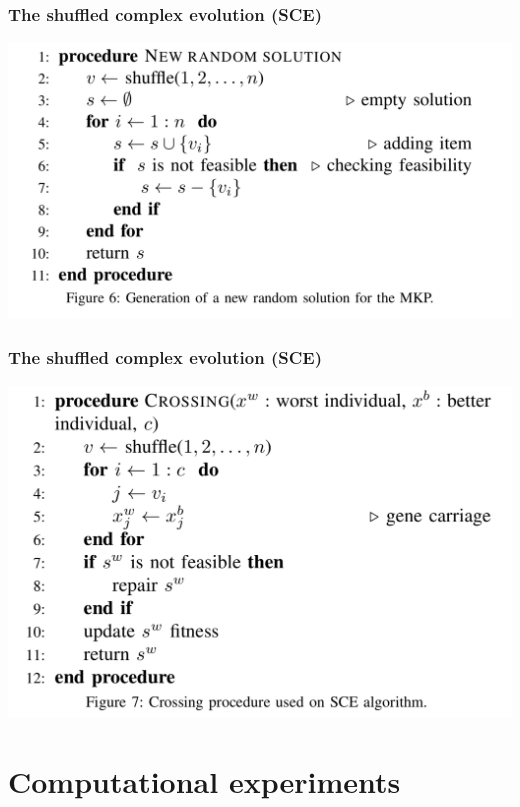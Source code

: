 \documentclass[10pt,fleqn]{beamer}
\begin{document}
\begin{frame}
	\frametitle{The shuffled complex evolution (SCE)}
\begin{center}
		\includegraphics[scale=0.2]{rand}
\end{center}
\end{frame}

\begin{frame}
	\frametitle{The shuffled complex evolution (SCE)}
\begin{center}
		\includegraphics[scale=0.2]{cross}
\end{center}
\end{frame}

\section{Computational experiments}
\end{document}

